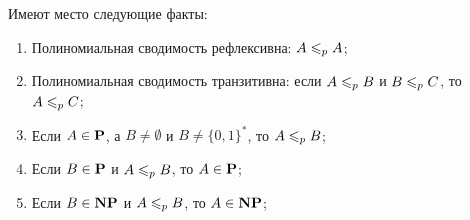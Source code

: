 \begin{statement}
    Имеют место следующие факты:

    \begin{enumerate}
        \item Полиномиальная сводимость рефлексивна: $A \leqslant_p A$;
        \item Полиномиальная сводимость транзитивна: если $A\leqslant_p B$ и $B \leqslant_p C$, то $A \leqslant_p C$;
        \item Если $A\in\textbf{P}$, а $B\neq \emptyset$ и $B\neq\{0,1\}^*$, то $A \leqslant_p B$;
        \item Если $B\in \textbf{P}$ и $A\leqslant_p B$, то $A\in \textbf{P}$;
        \item Если $B\in \textbf{NP}$ и $A\leqslant_p B$, то $A\in \textbf{NP}$;
    \end{enumerate}
\end{statement}

